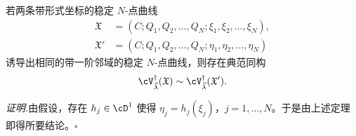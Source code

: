 \begin{corollary}[3.14]
若两条带形式坐标的稳定 $N$-点曲线
\[
\begin{aligned}
\mathfrak{X}&=(C;Q_1,Q_2,\dots,Q_N;\xi_1,\xi_2,\dots,\xi_N),\\
\mathfrak{X}'&=(C;Q_1,Q_2,\dots,Q_N;\eta_1,\eta_2,\dots,\eta_N)
\end{aligned}
\]
诱导出相同的带一阶邻域的稳定 $N$-点曲线，则存在典范同构
\[
\cV_{\vec{\lambda}}^{\dagger}(\mathfrak{X})\sim\cV_{\vec{\lambda}}^{\dagger}(\mathfrak{X}').
\]
\end{corollary}

\noindent\textit{证明.}\quad 由假设，存在 $h_j\in\cD^{1}$ 使得 $\eta_j=h_j(\xi_j)$，$j=1,\dots,N$。于是由上述定理即得所要结论。\hfill$\square$


